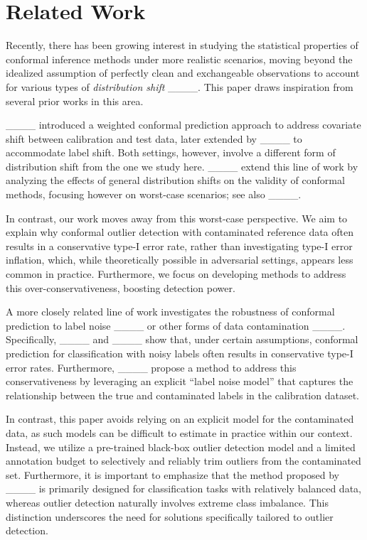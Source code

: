 \section{Related Work}
Recently, there has been growing interest in studying the statistical properties of conformal inference methods under more realistic scenarios, moving beyond the idealized assumption of perfectly clean and exchangeable observations to account for various types of {\em distribution shift} ____. This paper draws inspiration from several prior works in this area.

____ introduced a weighted conformal prediction approach to address covariate shift between calibration and test data, later extended by ____ to accommodate label shift. Both settings, however, involve a different form of distribution shift from the one we study here. ____ extend this line of work by analyzing the effects of general distribution shifts on the validity of conformal methods, focusing however on worst-case scenarios; see also ____.

In contrast, our work moves away from this worst-case perspective. We aim to explain why conformal outlier detection with contaminated reference data often results in a conservative type-I error rate, rather than investigating type-I error inflation, which, while theoretically possible in adversarial settings, appears less common in practice. Furthermore, we focus on developing methods to address this over-conservativeness, boosting detection power.

A more closely related line of work investigates the robustness of conformal prediction to label noise ____ or other forms of data contamination ____. Specifically, ____ and ____ show that, under certain assumptions, conformal prediction for classification with noisy labels often results in conservative type-I error rates. Furthermore, ____ propose a method to address this conservativeness by leveraging an explicit ``label noise model'' that captures the relationship between the true and contaminated labels in the calibration dataset.

In contrast, this paper avoids relying on an explicit model for the contaminated data, as such models can be difficult to estimate in practice within our context. Instead, we utilize a pre-trained black-box outlier detection model and a limited annotation budget to selectively and reliably trim outliers from the contaminated set. Furthermore, it is important to emphasize that the method proposed by ____ is primarily designed for classification tasks with relatively balanced data, whereas outlier detection naturally involves extreme class imbalance. This distinction underscores the need for solutions specifically tailored to outlier detection.